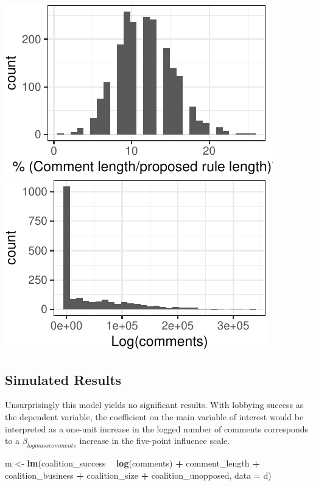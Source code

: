 \documentclass[
      12pt,
        ]{article}
\newenvironment{Shaded}{\begin{snugshade}}{\end{snugshade}}
\newcommand{\DataTypeTok}[1]{\textcolor[rgb]{0.13,0.29,0.53}{#1}}
\newcommand{\KeywordTok}[1]{\textcolor[rgb]{0.13,0.29,0.53}{\textbf{#1}}}
\newcommand{\NormalTok}[1]{#1}
\newcommand{\OperatorTok}[1]{\textcolor[rgb]{0.81,0.36,0.00}{\textbf{#1}}}
\newcommand{\StringTok}[1]{\textcolor[rgb]{0.31,0.60,0.02}{#1}}
\begin{document}
\includegraphics{Figs/hist_comments-1.pdf} \includegraphics{Figs/hist_comments-2.pdf}

\hypertarget{simulated-results}{%
\subsection{Simulated Results}\label{simulated-results}}

Unsurprisingly this model yields no significant results. With lobbying success as the dependent variable, the coefficient on the main variable of interest would be interpreted as a one-unit increase in the logged number of comments corresponds to a \(\beta_{logmasscomments}\) increase in the five-point influence scale.

\begin{Shaded}
\begin{Highlighting}[]
\NormalTok{m <-}\StringTok{ }\KeywordTok{lm}\NormalTok{(coalition_success }\OperatorTok{~}\StringTok{ }\KeywordTok{log}\NormalTok{(comments) }\OperatorTok{+}\StringTok{ }
\StringTok{          }\NormalTok{comment_length }\OperatorTok{+}\StringTok{ }
\StringTok{          }\NormalTok{coalition_business }\OperatorTok{+}\StringTok{  }
\StringTok{          }\NormalTok{coalition_size }\OperatorTok{+}\StringTok{ }
\StringTok{          }\NormalTok{coalition_unopposed, }
        \DataTypeTok{data =}\NormalTok{ d) }
\end{Highlighting}
\end{Shaded}
\end{document}
